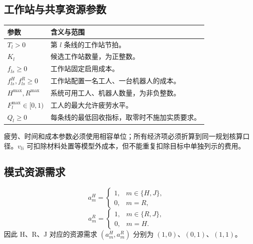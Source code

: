 \documentclass[UTF8,a4paper,11pt]{ctexart}
\begin{document}
\subsection{工作站与共享资源参数}
\begin{longtable}{p{}p{}}
\toprule 参数 & 含义与范围\\\midrule
$T_l>0$ & 第 $l$ 条线的工作站节拍。\\
$K_l$ & 候选工作站数量，为正整数。\\
$f_{ls}\geq0$ & 工作站固定启用成本。\\
$f_{ls}^{H},f_{ls}^{R}\geq0$ & 工作站配置一名工人、一台机器人的成本。\\
$H^{\max},R^{\max}$ & 系统可用工人、机器人数量，为非负整数。\\
$F_l^{\max}\in[0,1)$ & 工人的最大允许疲劳水平。\\
$Q_l\geq0$ & 每条线的最低回收指标，取零时不施加实质要求。\\\bottomrule
\end{longtable}
疲劳、时间和成本参数必须使用相容单位；所有经济项必须折算到同一规划核算口径。$v_{li}$ 可扣除材料处置等模型外成本，但不能重复扣除目标中单独列示的费用。

\subsection{模式资源需求}
\begin{equation}
a_m^H=\begin{cases}1,&m\in\{H,J\},\\0,&m=R,\end{cases}\tag{2}
\end{equation}
\begin{equation}
a_m^R=\begin{cases}1,&m\in\{R,J\},\\0,&m=H.\end{cases}\tag{3}
\end{equation}
因此 H、R、J 对应的资源需求 $(a_m^H,a_m^R)$ 分别为 $(1,0)$、$(0,1)$、$(1,1)$。
\end{document}
